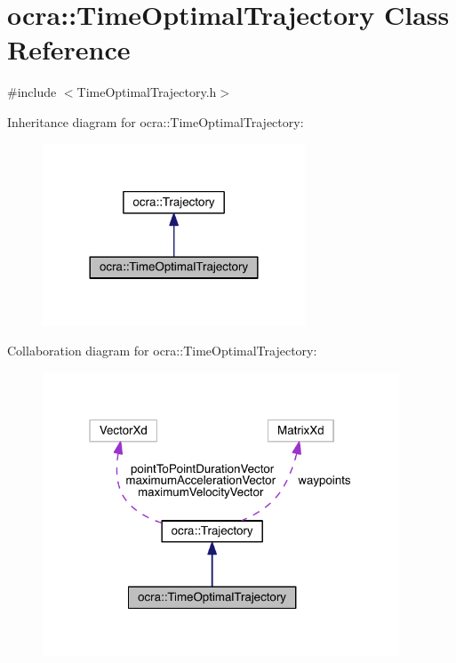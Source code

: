\hypertarget{classocra_1_1TimeOptimalTrajectory}{}\section{ocra\+:\+:Time\+Optimal\+Trajectory Class Reference}
\label{classocra_1_1TimeOptimalTrajectory}


{\ttfamily \#include $<$Time\+Optimal\+Trajectory.\+h$>$}



Inheritance diagram for ocra\+:\+:Time\+Optimal\+Trajectory\+:\nopagebreak
\begin{figure}[H]
\begin{center}
\leavevmode
\includegraphics[width=221pt]{d8/d53/classocra_1_1TimeOptimalTrajectory__inherit__graph}
\end{center}
\end{figure}


Collaboration diagram for ocra\+:\+:Time\+Optimal\+Trajectory\+:\nopagebreak
\begin{figure}[H]
\begin{center}
\leavevmode
\includegraphics[width=301pt]{d5/d36/classocra_1_1TimeOptimalTrajectory__coll__graph}
\end{center}
\end{figure}
